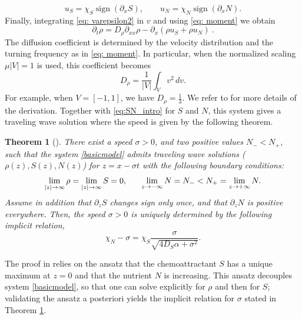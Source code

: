 \documentclass[11pt,twoside]{article}
\numberwithin{equation}{section}
\DeclareMathOperator{\sign}{sign}
\theoremstyle{plain}
\newtheorem{theorem}{Theorem}[section]
\theoremstyle{nonumberplain}
\begin{document}
\[
u_S=\chi_S\sign(\partial_x S),
\qquad
u_N=\chi_N\sign(\partial_x N).
\]
Finally, integrating \eqref{eq: varepsilon2} in ${v}$ and using \eqref{eq: moment} we obtain
\[
\partial_t\rho=D_\rho\partial_{xx}\rho-\partial_x(\rho u_S+\rho u_N)\ .
\]
{
The diffusion coefficient is determined by the velocity distribution and
the turning frequency as in \eqref{eq: moment}. 
In particular, when the normalized scaling \(\mu |V|=1\) is used, this
coefficient becomes
\begin{equation}
\label{def:Drho}
  D_\rho
=
\frac1{|V|}
\int_V v^2\,dv .  
\end{equation}
For example, when \( V = [-1,1] \), we have $D_\rho = \frac{1}{3}$.
}
We refer to \cite{emako2015existence,emako2016traveling} for more details of the derivation.
Together with \eqref{eq:SN_intro} for $S$ and $N$, this system gives a traveling wave solution where the speed is given by the following theorem.

\begin{theorem}[\cite{calvez2019chemotactic}]\label{thmacro}
There exist a speed $\sigma>0$, and two positive values $N_- < N_+$, such that the system \eqref{basicmodel} admits traveling wave solutions ($\rho (z), S(z), N(z)$) for $z=x - \sigma t$ with the following boundary conditions:
\begin{equation}
    \lim_{|z| \to \infty} \rho = \lim_{|z| \to \infty} S = 0, \hspace{0.6cm} \lim_{z \to -\infty} N = N_- < N_+ = \lim_{z \to + \infty} N.
    \nonumber
\end{equation}
Assume in addition that $\partial_z S$ changes sign only once, and that $\partial_z N$ is positive everywhere. Then, the speed $\sigma > 0$ is uniquely determined by the following implicit relation,
\[
\chi_N - \sigma = \chi_S \frac{\sigma}{\sqrt{4 D_S \alpha + \sigma^2}}.
\]
\end{theorem}
The proof in \cite{calvez2019chemotactic} relies on the ansatz that the chemoattractant $S$ has a unique maximum at $z=0$ and that the nutrient $N$ is increasing. This ansatz decouples system \eqref{basicmodel}, so that one can solve explicitly for $\rho$ and then for $S$; validating the ansatz a posteriori yields the implicit relation for $\sigma$ stated in Theorem \ref{thmacro}.
\end{document}
